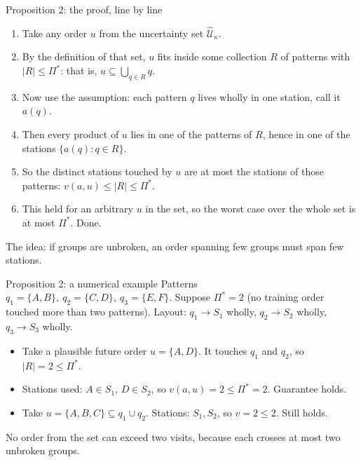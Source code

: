 \documentclass[11pt,aspectratio=169]{beamer}
\begin{document}
\begin{frame}{Proposition 2: the proof, line by line}
  \begin{enumerate}
    \item Take any order $u$ from the uncertainty set $\widehat{\mathcal U}_\kappa$.
    \item By the definition of that set, $u$ fits inside some collection $R$ of patterns with $|R|\le\Pi^*$: that is, $u \subseteq \bigcup_{q\in R} q$.
    \item Now use the assumption: each pattern $q$ lives wholly in one station, call it $a(q)$.
    \item Then every product of $u$ lies in one of the patterns of $R$, hence in one of the stations $\{a(q): q\in R\}$.
    \item So the distinct stations touched by $u$ are at most the stations of those patterns: $v(a,u) \le |R| \le \Pi^*$.
    \item This held for an arbitrary $u$ in the set, so the worst case over the whole set is at most $\Pi^*$. Done.
  \end{enumerate}
  The idea: if groups are unbroken, an order spanning few groups must span few stations.
\end{frame}

\begin{frame}{Proposition 2: a numerical example}
  Patterns $q_1=\{A,B\},\ q_2=\{C,D\},\ q_3=\{E,F\}$. Suppose $\Pi^*=2$ (no training order touched more than two patterns).
  Layout: $q_1\to S_1$ wholly, $q_2\to S_2$ wholly, $q_3\to S_3$ wholly.
  \begin{itemize}
    \item Take a plausible future order $u=\{A,D\}$. It touches $q_1$ and $q_2$, so $|R|=2\le\Pi^*$.
    \item Stations used: $A\in S_1$, $D\in S_2$, so $v(a,u)=2 \le \Pi^*=2$. Guarantee holds.
    \item Take $u=\{A,B,C\}\subseteq q_1\cup q_2$. Stations: $S_1,S_2$, so $v=2\le 2$. Still holds.
  \end{itemize}
  No order from the set can exceed two visits, because each crosses at most two unbroken groups.
\end{frame}
\end{document}
